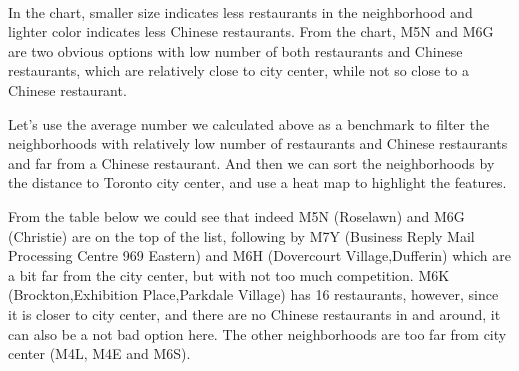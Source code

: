 \documentclass[11pt]{article}
\begin{document}
    \begin{center}
    \end{center}
    { \hspace*{\fill} \\}
    
    In the chart, smaller size indicates less restaurants in the
neighborhood and lighter color indicates less Chinese restaurants. From
the chart, M5N and M6G are two obvious options with low number of both
restaurants and Chinese restaurants, which are relatively close to city
center, while not so close to a Chinese restaurant.

Let's use the average number we calculated above as a benchmark to
filter the neighborhoods with relatively low number of restaurants and
Chinese restaurants and far from a Chinese restaurant. And then we can
sort the neighborhoods by the distance to Toronto city center, and use a
heat map to highlight the features.

From the table below we could see that indeed M5N (Roselawn) and M6G
(Christie) are on the top of the list, following by M7Y (Business Reply
Mail Processing Centre 969 Eastern) and M6H (Dovercourt
Village,Dufferin) which are a bit far from the city center, but with not
too much competition. M6K (Brockton,Exhibition Place,Parkdale Village)
has 16 restaurants, however, since it is closer to city center, and
there are no Chinese restaurants in and around, it can also be a not bad
option here. The other neighborhoods are too far from city center (M4L,
M4E and M6S).
\end{document}
